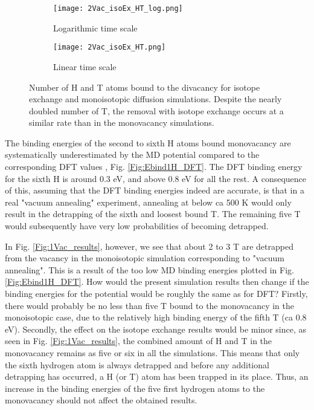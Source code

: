 \begin{figure}[!ht]
\begin{subfigure}{.5\textwidth}
  \centering
 \texttt{[image: 2Vac\_isoEx\_HT\_log.png]}  
  \caption{Logarithmic time scale}
\end{subfigure}
\begin{subfigure}{.5\textwidth}
  \centering
  \texttt{[image: 2Vac\_isoEx\_HT.png]}  
  \caption{Linear time scale}
\end{subfigure}
   \caption{Number of H and T atoms bound to the divacancy for isotope exchange and monoisotopic diffusion simulations. Despite the nearly doubled number of T, the removal with isotope exchange occurs at a similar rate than in the monovacancy simulations.}
   \label{Fig:2Vac_results} 
\end{figure}

The binding energies of the second to sixth H atoms bound monovacancy are systematically underestimated by the MD potential compared to the corresponding DFT values \cite{heinolaTungstenDFT}, Fig. \ref{Fig:Ebind1H_DFT}.
The DFT binding energy for the sixth H is around 0.3 eV, and above 0.8 eV for all the rest.
A consequence of this, assuming that the DFT binding energies indeed are accurate, is that in a real "vacuum annealing" experiment, annealing at below ca 500 K would only result in the detrapping of the sixth and loosest bound T.
The remaining five T would subsequently have very low probabilities of becoming detrapped.

In Fig. \ref{Fig:1Vac_results}, however, we see that about 2 to 3 T are detrapped from the vacancy in the monoisotopic simulation corresponding to "vacuum annealing".
This is a result of the too low MD binding energies plotted in Fig. \ref{Fig:Ebind1H_DFT}.
How would the present simulation results then change if the binding energies for the potential would be roughly the same as for DFT?
Firstly, there would probably be no less than five T bound to the monovacancy in the monoisotopic case, due to the relatively high binding energy of the fifth T (ca 0.8 eV).
Secondly, the effect on the isotope exchange results would be minor since, as seen in Fig. \ref{Fig:1Vac_results}, the combined amount of H and T in the monovacancy remains as five or six in all the simulations.
This means that only the sixth hydrogen atom is always detrapped and before any additional detrapping has occurred, a H (or T) atom has been trapped in its place.
Thus, an increase in the binding energies of the five first hydrogen atoms to the monovacancy should not affect the obtained results.

